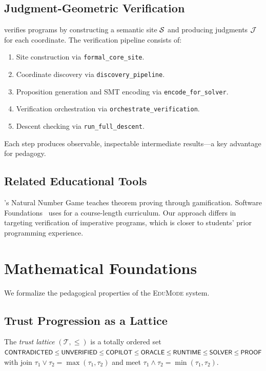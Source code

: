 \documentclass[11pt]{article}
\newcommand{\EduMode}{\textsc{EduMode}}
\begin{document}
\subsection{Judgment-Geometric Verification}

\JuGeo{} verifies \Python{} programs by constructing a semantic site $\mathcal{S}$
and producing judgments $\mathcal{J}$ for each coordinate. The verification pipeline
consists of:
\begin{enumerate}
  \item Site construction via \texttt{formal\_core\_site}.
  \item Coordinate discovery via \texttt{discovery\_pipeline}.
  \item Proposition generation and SMT encoding via \texttt{encode\_for\_solver}.
  \item Verification orchestration via \texttt{orchestrate\_verification}.
  \item Descent checking via \texttt{run\_full\_descent}.
\end{enumerate}

Each step produces observable, inspectable intermediate results---a key
advantage for pedagogy.

\subsection{Related Educational Tools}

\LEAN{}'s Natural Number Game teaches theorem proving through gamification.
Software Foundations~\cite{pierce2019software} uses \Coq{} for a
course-length curriculum. Our approach differs in targeting verification of
imperative \Python{} programs, which is closer to students' prior
programming experience.

\section{Mathematical Foundations}\label{sec:math-foundations}

We formalize the pedagogical properties of the \EduMode{} system.

\subsection{Trust Progression as a Lattice}

\begin{definition}
The \emph{trust lattice} $(\mathcal{T}, \leq)$ is a totally ordered set
$\mathsf{CONTRADICTED} \leq \mathsf{UNVERIFIED} \leq \mathsf{COPILOT} \leq \mathsf{ORACLE} \leq \mathsf{RUNTIME}
\leq \mathsf{SOLVER} \leq \mathsf{PROOF}$
with join $\tau_1 \vee \tau_2 = \max(\tau_1, \tau_2)$ and meet
$\tau_1 \wedge \tau_2 = \min(\tau_1, \tau_2)$.
\end{definition}
\end{document}
